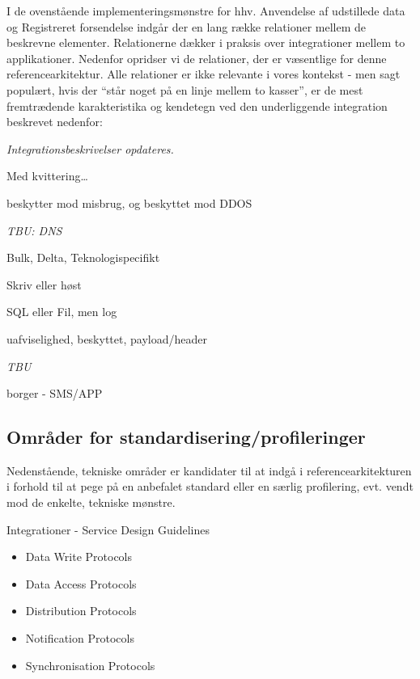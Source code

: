 I de ovenstående implementeringsmønstre for hhv. Anvendelse af
udstillede data og Registreret forsendelse indgår der en lang række
relationer mellem de beskrevne elementer. Relationerne dækker i praksis
over integrationer mellem to applikationer. Nedenfor opridser vi de
relationer, der er væsentlige for denne referencearkitektur. Alle
relationer er ikke relevante i vores kontekst - men sagt populært, hvis
der ``står noget på en linje mellem to kasser'', er de mest fremtrædende
karakteristika og kendetegn ved den underliggende integration beskrevet
nedenfor:

\emph{Integrationsbeskrivelser opdateres.}

\begin{description}
\tightlist
\item[skriv]
Med kvittering\ldots{}
\item[opslag]
beskytter mod misbrug, og beskyttet mod DDOS
\end{description}

\emph{TBU: DNS}

\begin{description}
\tightlist
\item[opdater]
Bulk, Delta, Teknologispecifikt
\item[konsolider]
Skriv eller høst
\item[læs]
SQL eller Fil, men log
\item[distribution]
uafviselighed, beskyttet, payload/header
\item[hent meddelelse]
\emph{TBU}
\item[modtag notifikation]
borger - SMS/APP
\end{description}

\subsection{Områder for
standardisering/profileringer}\label{omruxe5der-for-standardiseringprofileringer}

Nedenstående, tekniske områder er kandidater til at indgå i
referencearkitekturen i forhold til at pege på en anbefalet standard
eller en særlig profilering, evt. vendt mod de enkelte, tekniske
mønstre.

Integrationer - Service Design Guidelines

\begin{itemize}
\tightlist
\item
  Data Write Protocols
\item
  Data Access Protocols
\item
  Distribution Protocols
\item
  Notification Protocols
\item
  Synchronisation Protocols
\end{itemize}

